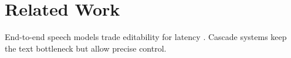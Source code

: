 \section{Related Work}
End-to-end speech models trade editability for latency \cite{vaswani2017}.
Cascade systems keep the text bottleneck but allow precise control.
